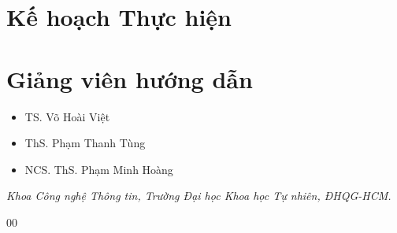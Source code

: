 \documentclass[conference]{IEEEtran}
\begin{document}
\section{Kế hoạch Thực hiện}


\section*{Giảng viên hướng dẫn}

\begin{itemize}
    \item TS. Võ Hoài Việt
    \item ThS. Phạm Thanh Tùng
    \item NCS. ThS. Phạm Minh Hoàng
\end{itemize}
\textit{Khoa Công nghệ Thông tin, Trường Đại học Khoa học Tự nhiên, ĐHQG-HCM.}

\begin{thebibliography}{00}

\end{thebibliography}
\end{document}
